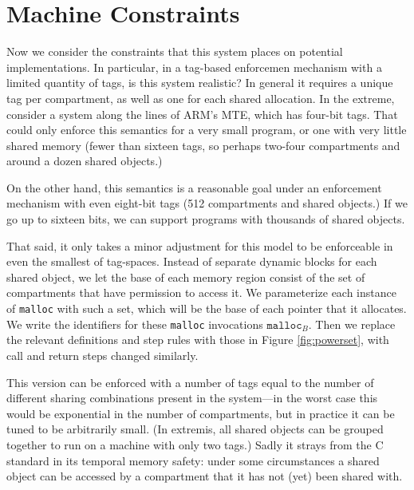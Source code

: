 \documentclass{article}
\begin{document}
\section{Machine Constraints}

Now we consider the constraints that this system places on potential implementations.
In particular, in a tag-based enforcemen mechanism with a limited quantity of tags,
is this system realistic? In general it requires a unique tag per compartment,
as well as one for each shared allocation. In the extreme, consider a system along
the lines of ARM's MTE, which has four-bit tags. That could only enforce this
semantics for a very small program, or one with very little shared memory
(fewer than sixteen tags, so perhaps two-four compartments and around a dozen shared objects.)

On the other hand, this semantics is a reasonable goal under an enforcement mechanism
with even eight-bit tags (512 compartments and shared objects.) If we go up to sixteen
bits, we can support programs with thousands of shared objects.

That said, it only takes a minor adjustment for this model to be enforceable in even
the smallest of tag-spaces. Instead of separate dynamic blocks for each shared
object, we let the base of each memory region consist of the set of compartments
that have permission to access it. We parameterize each instance of {\tt malloc}
with such a set, which will be the base of each pointer that it allocates. We write
the identifiers for these {\tt malloc} invocations \(\mathtt{malloc}_B\).
Then we replace the relevant definitions and step rules with those in
Figure \ref{fig:powerset}, with call and return steps changed similarly.

This version can be enforced with a number of tags equal to the number of different
sharing combinations present in the system---in the worst case this would be
exponential in the number of compartments, but in practice it can be tuned to be
arbitrarily small. (In extremis, all shared objects can be grouped together to run
on a machine with only two tags.) Sadly it strays from the C standard in its
temporal memory safety: under some circumstances a shared object can be accessed
by a compartment that it has not (yet) been shared with.
\end{document}
